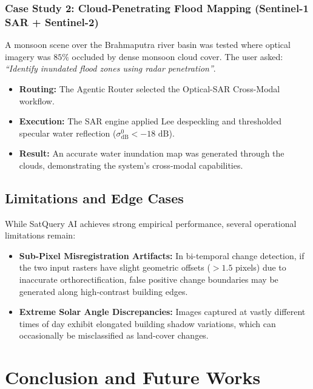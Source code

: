 \documentclass[12pt,a4paper]{report}
\begin{document}
\subsection{Case Study 2: Cloud-Penetrating Flood Mapping (Sentinel-1 SAR + Sentinel-2)}
A monsoon scene over the Brahmaputra river basin was tested where optical imagery was $85\%$ occluded by dense monsoon cloud cover. The user asked: \textit{``Identify inundated flood zones using radar penetration''}.
\begin{itemize}
    \item \textbf{Routing:} The Agentic Router selected the Optical-SAR Cross-Modal workflow.
    \item \textbf{Execution:} The SAR engine applied Lee despeckling and thresholded specular water reflection ($\sigma^0_{\text{dB}} < -18\text{ dB}$).
    \item \textbf{Result:} An accurate water inundation map was generated through the clouds, demonstrating the system's cross-modal capabilities.

\end{itemize}

\section{Limitations and Edge Cases}
While SatQuery AI achieves strong empirical performance, several operational limitations remain:
\begin{itemize}
    \item \textbf{Sub-Pixel Misregistration Artifacts:} In bi-temporal change detection, if the two input rasters have slight geometric offsets ($> 1.5$ pixels) due to inaccurate orthorectification, false positive change boundaries may be generated along high-contrast building edges.
    \item \textbf{Extreme Solar Angle Discrepancies:} Images captured at vastly different times of day exhibit elongated building shadow variations, which can occasionally be misclassified as land-cover changes.
\end{itemize}

\chapter{Conclusion and Future Works}
\end{document}

